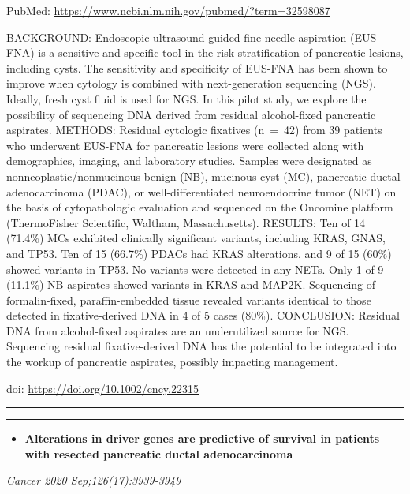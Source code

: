 \documentclass[
]{article}
\providecommand{\tightlist}{%
  \setlength{\itemsep}{0pt}\setlength{\parskip}{0pt}}
\begin{document}
PubMed: \url{https://www.ncbi.nlm.nih.gov/pubmed/?term=32598087}

BACKGROUND: Endoscopic ultrasound-guided fine needle aspiration
(EUS-FNA) is a sensitive and specific tool in the risk stratification of
pancreatic lesions, including cysts. The sensitivity and specificity of
EUS-FNA has been shown to improve when cytology is combined with
next-generation sequencing (NGS). Ideally, fresh cyst fluid is used for
NGS. In this pilot study, we explore the possibility of sequencing DNA
derived from residual alcohol-fixed pancreatic aspirates. METHODS:
Residual cytologic fixatives (n~=~42) from 39 patients who underwent
EUS-FNA for pancreatic lesions were collected along with demographics,
imaging, and laboratory studies. Samples were designated as
nonneoplastic/nonmucinous benign (NB), mucinous cyst (MC), pancreatic
ductal adenocarcinoma (PDAC), or well-differentiated neuroendocrine
tumor (NET) on the basis of cytopathologic evaluation and sequenced on
the Oncomine platform (ThermoFisher Scientific, Waltham, Massachusetts).
RESULTS: Ten of 14 (71.4\%) MCs exhibited clinically significant
variants, including KRAS, GNAS, and TP53. Ten of 15 (66.7\%) PDACs had
KRAS alterations, and 9 of 15 (60\%) showed variants in TP53. No
variants were detected in any NETs. Only 1 of 9 (11.1\%) NB aspirates
showed variants in KRAS and MAP2K. Sequencing of formalin-fixed,
paraffin-embedded tissue revealed variants identical to those detected
in fixative-derived DNA in 4 of 5 cases (80\%). CONCLUSION: Residual DNA
from alcohol-fixed aspirates are an underutilized source for NGS.
Sequencing residual fixative-derived DNA has the potential to be
integrated into the workup of pancreatic aspirates, possibly impacting
management.

doi: \url{https://doi.org/10.1002/cncy.22315}

\begin{center}\rule{0.5\linewidth}{0.5pt}\end{center}

\begin{center}\rule{0.5\linewidth}{0.5pt}\end{center}

\begin{itemize}
\tightlist
\item
  \textbf{Alterations in driver genes are predictive of survival in
  patients with resected pancreatic ductal adenocarcinoma}
\end{itemize}

\emph{Cancer 2020 Sep;126(17):3939-3949}
\end{document}
